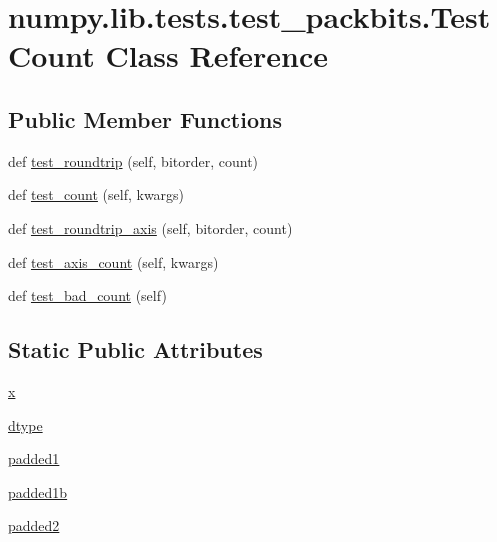 \hypertarget{classnumpy_1_1lib_1_1tests_1_1test__packbits_1_1TestCount}{}\section{numpy.\+lib.\+tests.\+test\+\_\+packbits.\+Test\+Count Class Reference}
\label{classnumpy_1_1lib_1_1tests_1_1test__packbits_1_1TestCount}
\subsection*{Public Member Functions}
\begin{DoxyCompactItemize}
\item 
def \hyperlink{classnumpy_1_1lib_1_1tests_1_1test__packbits_1_1TestCount_a79f4f5a9d8302f08e73b8755e5008b03}{test\+\_\+roundtrip} (self, bitorder, count)
\item 
def \hyperlink{classnumpy_1_1lib_1_1tests_1_1test__packbits_1_1TestCount_a532917ec5ee81805e6a5a8fd8fb3da79}{test\+\_\+count} (self, kwargs)
\item 
def \hyperlink{classnumpy_1_1lib_1_1tests_1_1test__packbits_1_1TestCount_a5af55fc4f20da40ee351439dafed5de9}{test\+\_\+roundtrip\+\_\+axis} (self, bitorder, count)
\item 
def \hyperlink{classnumpy_1_1lib_1_1tests_1_1test__packbits_1_1TestCount_ad2fa3e762aa884dea7be9e6b60e5977a}{test\+\_\+axis\+\_\+count} (self, kwargs)
\item 
def \hyperlink{classnumpy_1_1lib_1_1tests_1_1test__packbits_1_1TestCount_a287752b649ef7a4b13506a235d0e0bc2}{test\+\_\+bad\+\_\+count} (self)
\end{DoxyCompactItemize}
\subsection*{Static Public Attributes}
\begin{DoxyCompactItemize}
\item 
\hyperlink{classnumpy_1_1lib_1_1tests_1_1test__packbits_1_1TestCount_a4146ff4560ce1daa122de76e06d2d0e7}{x}
\item 
\hyperlink{classnumpy_1_1lib_1_1tests_1_1test__packbits_1_1TestCount_ac3e3cc2208161a09034236d087d65d14}{dtype}
\item 
\hyperlink{classnumpy_1_1lib_1_1tests_1_1test__packbits_1_1TestCount_a0604c5bfb99df5981577f9ff924b4d4e}{padded1}
\item 
\hyperlink{classnumpy_1_1lib_1_1tests_1_1test__packbits_1_1TestCount_a1d2c832c89495d641a677de1ac6a77f8}{padded1b}
\item 
\hyperlink{classnumpy_1_1lib_1_1tests_1_1test__packbits_1_1TestCount_a2919b4aa6f319b54cbb049e5b76507aa}{padded2}
\end{DoxyCompactItemize}


